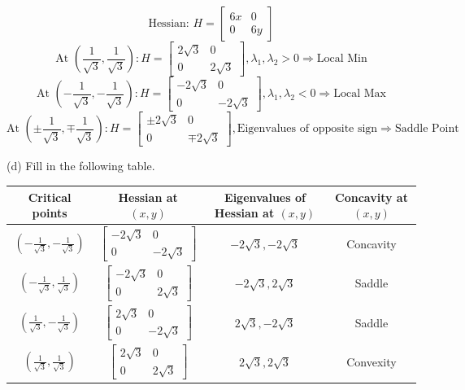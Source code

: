 \documentclass{article} %
\begin{document}
{    \[ \text{Hessian: }
    H = \begin{bmatrix}
    6x & 0 \\
    0 & 6y
    \end{bmatrix} \]
    \[ \text{At } \left( \frac{1}{\sqrt{3}}, \frac{1}{\sqrt{3}} \right):
    H = \begin{bmatrix} 2\sqrt{3} & 0 \\ 0 & 2\sqrt{3} \end{bmatrix}, \lambda_1,\lambda_2 > 0 \Rightarrow \text{Local Min} \]
    \[ \text{At } \left( -\frac{1}{\sqrt{3}}, -\frac{1}{\sqrt{3}} \right):
    H = \begin{bmatrix} -2\sqrt{3} & 0 \\ 0 & -2\sqrt{3} \end{bmatrix}, \lambda_1,\lambda_2 < 0 \Rightarrow \text{Local Max} \]
    \[ \text{At } \left( \pm \frac{1}{\sqrt{3}}, \mp \frac{1}{\sqrt{3}} \right): 
    H = \begin{bmatrix} \pm 2\sqrt{3} & 0 \\ 0 & \mp 2\sqrt{3} \end{bmatrix}, \text{Eigenvalues of opposite sign} \Rightarrow \text{Saddle Point} \]

    \noindent (d) Fill in the following table. \\

    \begin{tabular}{|c|c|c|c|}
        \hline
        Critical points & Hessian at $ (x, y) $ & Eigenvalues of Hessian at $ (x, y) $ & Concavity at $ (x, y) $ \\
        \hline
        $ \left(-\frac{1}{\sqrt{3}}, -\frac{1}{\sqrt{3}}\right) $ & $\begin{bmatrix} -2\sqrt{3} & 0 \\ 0 & -2\sqrt{3} \end{bmatrix}$ & $-2\sqrt{3}, -2\sqrt{3}$ & Concavity \\
        \hline
        $ \left(-\frac{1}{\sqrt{3}}, \frac{1}{\sqrt{3}}\right) $ & $\begin{bmatrix} -2\sqrt{3} & 0 \\ 0 & 2\sqrt{3} \end{bmatrix}$ & $-2\sqrt{3}, 2\sqrt{3}$ & Saddle \\
        \hline
        $ \left(\frac{1}{\sqrt{3}}, -\frac{1}{\sqrt{3}}\right) $ & $\begin{bmatrix} 2\sqrt{3} & 0 \\ 0 & -2\sqrt{3} \end{bmatrix}$ & $2\sqrt{3}, -2\sqrt{3}$ & Saddle \\
        \hline
        $ \left(\frac{1}{\sqrt{3}}, \frac{1}{\sqrt{3}}\right) $ & $\begin{bmatrix} 2\sqrt{3} & 0 \\ 0 & 2\sqrt{3} \end{bmatrix}$ & $2\sqrt{3}, 2\sqrt{3}$ & Convexity \\
        \hline
    \end{tabular} \\

}
\end{document}
